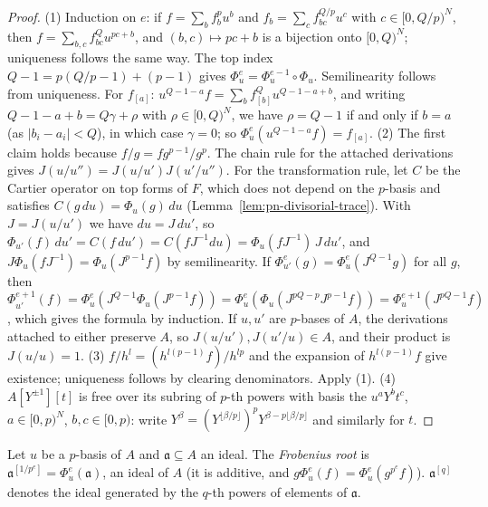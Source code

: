 \begin{proof}
(1) Induction on $e$: if $f=\sum_bf_b^pu^b$ and $f_b=\sum_cf_{bc}^{Q/p}u^c$ with $c\in[0,Q/p)^N$, then $f=\sum_{b,c}f_{bc}^Qu^{pc+b}$, and
$(b,c)\mapsto pc+b$ is a bijection onto $[0,Q)^N$; uniqueness follows the same way. The top index $Q-1=p(Q/p-1)+(p-1)$ gives
$\Phi^e_u=\Phi^{e-1}_u\circ\Phi_u$. Semilinearity follows from uniqueness. For $f_{[a]}$: $u^{Q-1-a}f=\sum_bf_{[b]}^Qu^{Q-1-a+b}$, and writing
$Q-1-a+b=Q\gamma+\rho$ with $\rho\in[0,Q)^N$, we have $\rho=Q-1$ if and only if $b=a$ (as $|b_i-a_i|<Q$), in which case $\gamma=0$;
so $\Phi^e_u(u^{Q-1-a}f)=f_{[a]}$.
(2) The first claim holds because $f/g=fg^{p-1}/g^p$. The chain rule for the attached derivations gives $J(u/u'')=J(u/u')J(u'/u'')$.
For the transformation rule, let $C$ be the Cartier operator on top forms of $F$, which does not depend on the $p$-basis and satisfies
$C(g\,du)=\Phi_u(g)\,du$ (Lemma~\ref{lem:pn-divisorial-trace}). With $J=J(u/u')$ we have $du=J\,du'$, so
$\Phi_{u'}(f)\,du'=C(f\,du')=C(fJ^{-1}du)=\Phi_u(fJ^{-1})\,J\,du'$, and $J\Phi_u(fJ^{-1})=\Phi_u(J^{p-1}f)$ by semilinearity. If
$\Phi^e_{u'}(g)=\Phi^e_u(J^{Q-1}g)$ for all $g$, then
$\Phi^{e+1}_{u'}(f)=\Phi^e_u(J^{Q-1}\Phi_u(J^{p-1}f))=\Phi^e_u(\Phi_u(J^{pQ-p}J^{p-1}f))=\Phi^{e+1}_u(J^{pQ-1}f)$, which gives the formula by induction.
If $u,u'$ are $p$-bases of $A$, the derivations attached to either preserve $A$, so $J(u/u'),J(u'/u)\in A$, and their product is $J(u/u)=1$.
(3) $f/h^l=(h^{l(p-1)}f)/h^{lp}$ and the expansion of $h^{l(p-1)}f$ give existence; uniqueness follows by clearing denominators. Apply (1).
(4) $A[Y^{\pm1}][t]$ is free over its subring of $p$-th powers with basis the $u^aY^bt^c$, $a\in[0,p)^N$, $b,c\in[0,p)$: write
$Y^\beta=(Y^{\lfloor\beta/p\rfloor})^pY^{\beta-p\lfloor\beta/p\rfloor}$ and similarly for $t$.
\end{proof}

\begin{definition}\label{def:sg-root}
\leanok
{}
Let $u$ be a $p$-basis of $A$ and $\mathfrak a\subseteq A$ an ideal. The \emph{Frobenius root} is $\mathfrak a^{[1/p^e]}=\Phi^e_u(\mathfrak a)$, an ideal of $A$
(it is additive, and $g\Phi^e_u(f)=\Phi^e_u(g^{p^e}f)$). $\mathfrak a^{[q]}$ denotes the ideal generated by the $q$-th powers of elements of $\mathfrak a$.
\end{definition}

